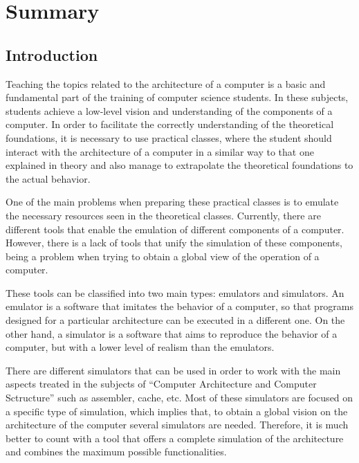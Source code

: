 \chead[]{}
\renewcommand{\headrulewidth}{0.5pt}

\lfoot[]{}
\cfoot[]{}
\rfoot[]{}
\renewcommand{\footrulewidth}{0pt}

\appendix
\clearpage
\addappheadtotoc
\appendixpage
\chapter{Summary}

\section*{Introduction}

Teaching the topics related to the architecture of a computer is a basic and fundamental part of the training of computer science students. In these subjects, students achieve a low-level vision and understanding of the components of a computer. In order to facilitate the correctly understanding of the theoretical foundations, it is necessary to use practical classes, where the student should interact with the architecture of a computer in a similar way to that one explained in theory and also manage to extrapolate the theoretical foundations to the actual behavior.

One of the main problems when preparing these practical classes is to emulate the necessary resources seen in the theoretical classes. Currently, there are different tools that enable the emulation of different components of a computer. However, there is a lack of tools that unify the simulation of these components, being a problem when trying to obtain a global view of the operation of a computer.

These tools can be classified into two main types: emulators and simulators. An emulator is a software that imitates the behavior of a computer, so that programs designed for a particular architecture can be executed in a different one. On the other hand, a simulator is a software that aims to reproduce the behavior of a computer, but with a lower level of realism than the emulators.

There are different simulators that can be used in order to work with the main aspects treated in the subjects of ``Computer Architecture and Computer Sctructure'' such as assembler, cache, etc. Most of these simulators are focused on a specific type of simulation, which implies that, to obtain a global vision on the architecture of the computer several simulators are needed. Therefore, it is much better to count with a tool that offers a complete simulation of the architecture and combines the maximum possible functionalities.

